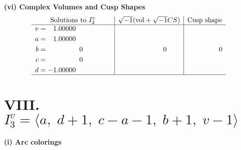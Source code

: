 \documentclass[1p]{elsarticle_modified}
\theoremstyle{definition}
\newcommand{\I}{\sqrt{-1}}
\begin{document}
\newpage\flushleft \textbf{(vi) Complex Volumes and Cusp Shapes}
$$\begin{array}{c|c|c}  
\text{Solutions to }I^v_{2}& \I (\text{vol} + \sqrt{-1}CS) & \text{Cusp shape}\\
 \hline 
\begin{aligned}
v &= \phantom{-}1.00000\phantom{ +0.000000I} \\
a &= \phantom{-}1.00000\phantom{ +0.000000I} \\
b &= \phantom{-0.000000 } 0 \\
c &= \phantom{-0.000000 } 0 \\
d &= -1.00000\phantom{ +0.000000I}\end{aligned}
 & \phantom{-0.000000 } 0 & \phantom{-0.000000 } 0\\
 \hline 
 \end{array}$$\newpage\newpage\renewcommand{\arraystretch}{1}
\centering \section*{VIII. $I^v_{3}= \langle a,\;d+1,\;c- a-1,\;b+1,\;v-1 \rangle$}
\flushleft \textbf{(i) Arc colorings}\\
\end{document}

